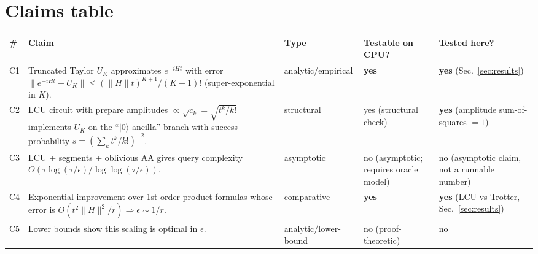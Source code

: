 \documentclass[11pt]{article}
\begin{document}
\section{Claims table}
\begin{tabular}{@{}p{0.5cm}p{7.5cm}p{2cm}p{2.5cm}p{2cm}@{}}
\toprule
\# & Claim & Type & Testable on CPU? & Tested here? \\
\midrule
C1 & Truncated Taylor $U_K$ approximates $e^{-iHt}$ with error $\|e^{-iHt}-U_K\| \le (\|H\|t)^{K+1}/(K+1)!$ (super-exponential in $K$). & analytic/empirical & \textbf{yes} & \textbf{yes} (Sec.~\ref{sec:results}) \\
C2 & LCU circuit with prepare amplitudes $\propto \sqrt{c_k}=\sqrt{t^k/k!}$ implements $U_K$ on the ``$|0\rangle$ ancilla'' branch with success probability $s = (\sum_k t^k/k!)^{-2}$. & structural & yes (structural check) & \textbf{yes} (amplitude sum-of-squares $=1$) \\
C3 & LCU + segments + oblivious AA gives query complexity $O(\tau\log(\tau/\epsilon)/\log\log(\tau/\epsilon))$. & asymptotic & no (asymptotic; requires oracle model) & no (asymptotic claim, not a runnable number) \\
C4 & Exponential improvement over 1st-order product formulas whose error is $O(t^2\|H\|^2/r)\Rightarrow \epsilon\sim 1/r$. & comparative & \textbf{yes} & \textbf{yes} (LCU vs Trotter, Sec.~\ref{sec:results}) \\
C5 & Lower bounds show this scaling is optimal in $\epsilon$. & analytic/lower-bound & no (proof-theoretic) & no \\
\bottomrule
\end{tabular}
\end{document}
